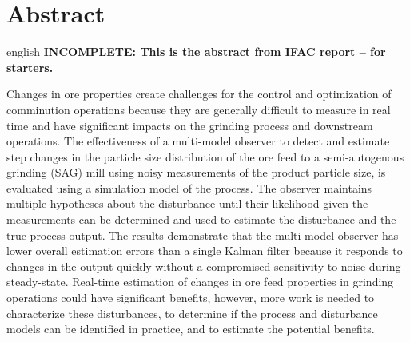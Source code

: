 \chapter*{Abstract}             %
\label{chap-abstract}           %

\begin{otherlanguage*}{english}
 \textbf{ INCOMPLETE: This is the abstract from IFAC report -- for starters.}
  
  Changes in ore properties create challenges for the control and optimization of comminution operations because they are generally difficult to measure in real time and have significant impacts on the grinding process and downstream operations. The effectiveness of a multi-model observer to detect and estimate step changes in the particle size distribution of the ore feed to a semi-autogenous grinding (SAG) mill using noisy measurements of the product particle size, is evaluated using a simulation model of the process. The observer maintains multiple hypotheses about the disturbance until their likelihood given the measurements can be determined and used to estimate the disturbance and the true process output. The results demonstrate that the multi-model observer has lower overall estimation errors than a single Kalman filter because it responds to changes in the output quickly without a compromised sensitivity to noise during steady-state. Real-time estimation of changes in ore feed properties in grinding operations could have significant benefits, however, more work is needed to characterize these disturbances, to determine if the process and disturbance models can be identified in practice, and to estimate the potential benefits.
\end{otherlanguage*}
